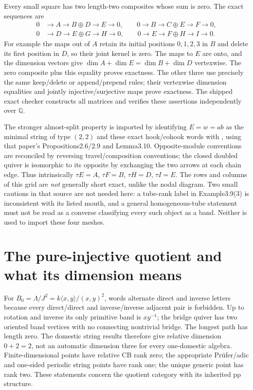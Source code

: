 \documentclass[11pt,oneside,openany]{book}
\theoremstyle{definition}\newtheorem{definition}[theorem]{Definition}
\theoremstyle{remark}\newtheorem{remark}[theorem]{Remark}
\begin{document}
Every small square has two length-two composites whose sum is zero. The exact sequences are
\[
\begin{split}
0&\to A\to B\oplus D\to E\to0,\qquad
0\to B\to C\oplus E\to F\to0,\\
0&\to D\to E\oplus G\to H\to0,\qquad
0\to E\to F\oplus H\to I\to0.
\end{split}
\]
For example the maps out of $A$ retain its initial positions $0,1,2,3$ in $B$ and delete its first position in $D$, so their joint kernel is zero. The maps to $E$ are onto, and the dimension vectors give $\dim A+\dim E=\dim B+\dim D$ vertexwise. The zero composite plus this equality proves exactness. The other three use precisely the same keep/delete or append/prepend rules; their vertexwise dimension equalities and jointly injective/surjective maps prove exactness. The shipped exact checker constructs all matrices and verifies these assertions independently over $\mathbb Q$.

The stronger almost-split property is imported by identifying $E=w=ab$ as the minimal string of type $(2,2)$ and these exact hook/cohook words with \cite[Proposition3.12]{HuangLinSu}, using that paper's Propositions2.6/2.9 and Lemma3.10. Opposite-module conventions are reconciled by reversing travel/composition conventions; the closed doubled quiver is isomorphic to its opposite by exchanging the two arrows at each chain edge. Thus intrinsically $\tau E=A$, $\tau F=B$, $\tau H=D$, $\tau I=E$. The rows and columns of this grid are \emph{not} generally short exact, unlike the nodal diagram. Two small cautions in that source are not needed here: a tube-rank label in Example3.9(3) is inconsistent with its listed mouth, and a general homogeneous-tube statement must not be read as a converse classifying every such object as a band. Neither is used to import these four meshes.

\section{The pure-injective quotient and what its dimension means}
For $B_0=\Lambda/J^2=k\langle x,y\rangle/(x,y)^2$, words alternate direct and inverse letters because every direct/direct and inverse/inverse adjacent pair is forbidden. Up to rotation and inverse its only primitive band is $xy^{-1}$; the bridge quiver has two oriented band vertices with no connecting nontrivial bridge. The longest path has length zero. The domestic string results \cite{PuninskiPrest,LakingPrestPuninski} therefore give relative dimension $0+2=2$, not an automatic dimension three for every one-domestic algebra. Finite-dimensional points have relative CB rank zero; the appropriate Prüfer/adic and one-sided periodic string points have rank one; the unique generic point has rank two. These statements concern the quotient category with its inherited pp structure.
\end{document}
